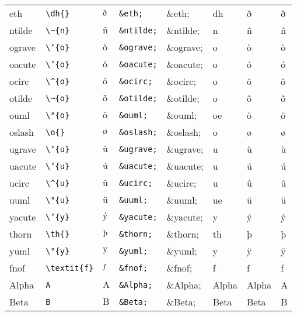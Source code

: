 \documentclass[11pt]{article}
\begin{document}
\begin{longtable}{llllllll}
eth & \texttt{\textbackslash{}dh\{\}} & $\mbox{\dh{}}$ & \texttt{\&eth;} & \&eth; & dh & ð & ð\\
ntilde & \texttt{\textbackslash{}\textasciitilde{}\{n\}} & $\mbox{\~{n}}$ & \texttt{\&ntilde;} & \&ntilde; & n & ñ & ñ\\
ograve & \texttt{\textbackslash{}`\{o\}} & $\mbox{\`{o}}$ & \texttt{\&ograve;} & \&ograve; & o & ò & ò\\
oacute & \texttt{\textbackslash{}'\{o\}} & $\mbox{\'{o}}$ & \texttt{\&oacute;} & \&oacute; & o & ó & ó\\
ocirc & \texttt{\textbackslash{}\textasciicircum{}\{o\}} & $\mbox{\^{o}}$ & \texttt{\&ocirc;} & \&ocirc; & o & ô & ô\\
otilde & \texttt{\textbackslash{}\textasciitilde{}\{o\}} & $\mbox{\~{o}}$ & \texttt{\&otilde;} & \&otilde; & o & õ & õ\\
ouml & \texttt{\textbackslash{}"\{o\}} & $\mbox{\"{o}}$ & \texttt{\&ouml;} & \&ouml; & oe & ö & ö\\
oslash & \texttt{\textbackslash{}o\{\}} & $\mbox{\o{}}$ & \texttt{\&oslash;} & \&oslash; & o & ø & ø\\
ugrave & \texttt{\textbackslash{}`\{u\}} & $\mbox{\`{u}}$ & \texttt{\&ugrave;} & \&ugrave; & u & ù & ù\\
uacute & \texttt{\textbackslash{}'\{u\}} & $\mbox{\'{u}}$ & \texttt{\&uacute;} & \&uacute; & u & ú & ú\\
ucirc & \texttt{\textbackslash{}\textasciicircum{}\{u\}} & $\mbox{\^{u}}$ & \texttt{\&ucirc;} & \&ucirc; & u & û & û\\
uuml & \texttt{\textbackslash{}"\{u\}} & $\mbox{\"{u}}$ & \texttt{\&uuml;} & \&uuml; & ue & ü & ü\\
yacute & \texttt{\textbackslash{}'\{y\}} & $\mbox{\'{y}}$ & \texttt{\&yacute;} & \&yacute; & y & ý & ý\\
thorn & \texttt{\textbackslash{}th\{\}} & $\mbox{\th{}}$ & \texttt{\&thorn;} & \&thorn; & th & þ & þ\\
yuml & \texttt{\textbackslash{}"\{y\}} & $\mbox{\"{y}}$ & \texttt{\&yuml;} & \&yuml; & y & ÿ & ÿ\\
fnof & \texttt{\textbackslash{}textit\{f\}} & $\mbox{\textit{f}}$ & \texttt{\&fnof;} & \&fnof; & f & f & ƒ\\
Alpha & \texttt{A} & $\mbox{A}$ & \texttt{\&Alpha;} & \&Alpha; & Alpha & Alpha & Α\\
Beta & \texttt{B} & $\mbox{B}$ & \texttt{\&Beta;} & \&Beta; & Beta & Beta & Β\\

\end{longtable}
\end{document}
